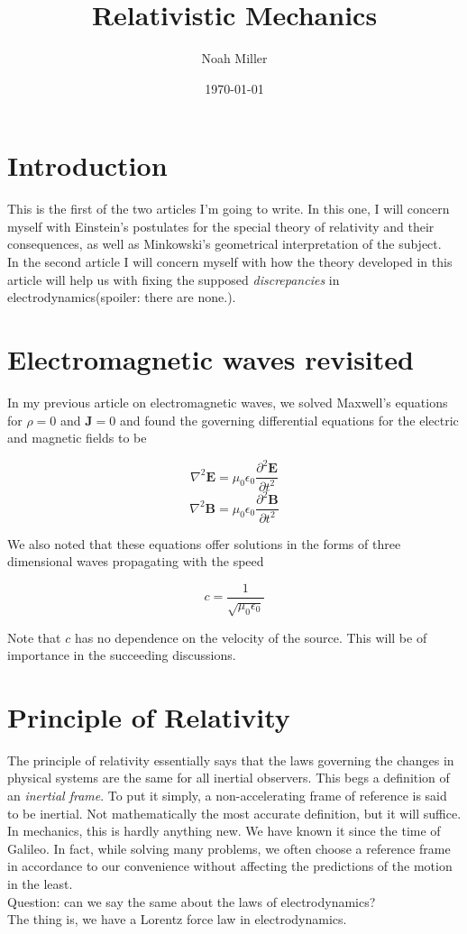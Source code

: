 \documentclass[12pt]{article}
\title{Relativistic Mechanics}
\author{Noah Miller}
\date{\today}
\begin{document}
\maketitle

\section{Introduction}
This is the first of the two articles I'm going to write. In this one, I will concern myself with 
Einstein's postulates for the special theory of relativity and their consequences, as well as 
Minkowski's geometrical interpretation of the subject.\\
In the second article I will concern myself with how the theory developed in this article will help us 
with fixing the supposed \textit{discrepancies} in electrodynamics(spoiler: there are none.).
\section{Electromagnetic waves revisited}
In my previous article on electromagnetic waves, we solved Maxwell's equations for $\rho=0$ and $\mathbf{J}=0$ 
and found the governing differential equations for the electric and magnetic fields to be 

\[\nabla^2 \mathbf{E} = \mu_0\epsilon_0\frac{\partial^2 \mathbf{E}}{\partial t^2}\]
\[\nabla^2 \mathbf{B} = \mu_0\epsilon_0\frac{\partial^2 \mathbf{B}}{\partial t^2}\]

We also noted that these equations offer solutions in the forms of three dimensional waves propagating with the speed

\[c = \frac{1}{\sqrt{\mu_0\epsilon_0}}\]

Note that $c$ has no dependence on the velocity of the source. This will be of importance in the succeeding
discussions. 

\section{Principle of Relativity}
The principle of relativity essentially says that the laws governing the changes in physical systems are the same for all inertial observers.
This begs a definition of an \textit{inertial frame}. To put it simply, a non-accelerating frame of reference is said to be inertial. Not mathematically 
the most accurate definition, but it will suffice.\\
In mechanics, this is hardly anything new. We have known it since the time of Galileo. In fact, while solving many problems, we often choose a reference frame 
in accordance to our convenience without affecting the predictions of the motion in the least. \\
Question: can we say the same about the laws of electrodynamics? \\
The thing is, we have a Lorentz force law in electrodynamics.
\end{document}
